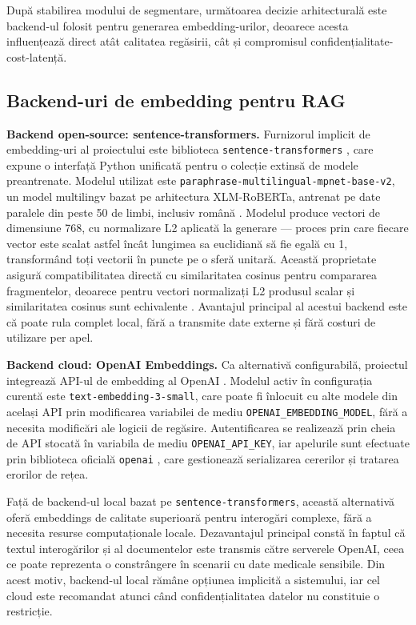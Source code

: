\documentclass[12pt, a4paper, oneside, romanian]{teza-upb}
\begin{document}
După stabilirea modului de segmentare, următoarea decizie arhitecturală este backend-ul folosit pentru generarea embedding-urilor, deoarece acesta influențează direct atât calitatea regăsirii, cât și compromisul confidențialitate-cost-latență.

\subsection{Backend-uri de embedding pentru RAG}

\textbf{Backend open-source: sentence-transformers.} Furnizorul implicit de 
embedding-uri al proiectului este biblioteca \texttt{sentence-transformers} 
\cite{sentence_transformers_doc}, care expune o interfață Python unificată pentru 
o colecție extinsă de modele preantrenate. Modelul utilizat este 
\texttt{paraphrase-multilingual-mpnet-base-v2}, un model multilingv bazat pe 
arhitectura XLM-RoBERTa, antrenat pe date paralele din peste 50 de limbi, 
inclusiv română \cite{paraphrase_multilingual_mpnet}. Modelul produce vectori de dimensiune 768, cu normalizare L2 aplicată la 
generare — proces prin care fiecare vector este scalat astfel încât lungimea 
sa euclidiană să fie egală cu 1, transformând toți vectorii în puncte pe o 
sferă unitară. Această proprietate asigură compatibilitatea directă cu 
similaritatea cosinus pentru compararea fragmentelor, deoarece pentru vectori 
normalizați L2 produsul scalar și similaritatea cosinus sunt echivalente 
\cite{paraphrase_multilingual_mpnet}. Avantajul principal al acestui backend 
este că poate rula complet local, fără a transmite date externe și fără costuri 
de utilizare per apel.

\textbf{Backend cloud: OpenAI Embeddings.} Ca alternativă configurabilă, 
proiectul integrează API-ul de embedding al OpenAI \cite{openai_embeddings}. 
Modelul activ în configurația curentă este \texttt{text-embedding-3-small}, 
care poate fi înlocuit cu alte modele din același API prin modificarea 
variabilei de mediu \texttt{OPENAI\_EMBEDDING\_MODEL}, fără a necesita 
modificări ale logicii de regăsire. Autentificarea se realizează prin cheia 
de API stocată în variabila de mediu \texttt{OPENAI\_API\_KEY}, iar apelurile 
sunt efectuate prin biblioteca oficială \texttt{openai} \cite{openai_api}, 
care gestionează serializarea cererilor și tratarea erorilor de rețea.

Față de backend-ul local bazat pe \texttt{sentence-transformers}, această 
alternativă oferă embeddings de calitate superioară pentru interogări complexe, 
fără a necesita resurse computaționale locale. Dezavantajul principal constă 
în faptul că textul interogărilor și al documentelor este transmis către 
serverele OpenAI, ceea ce poate reprezenta o constrângere în scenarii cu date 
medicale sensibile. Din acest motiv, backend-ul local rămâne opțiunea implicită 
a sistemului, iar cel cloud este recomandat atunci când confidențialitatea 
datelor nu constituie o restricție.
\end{document}
